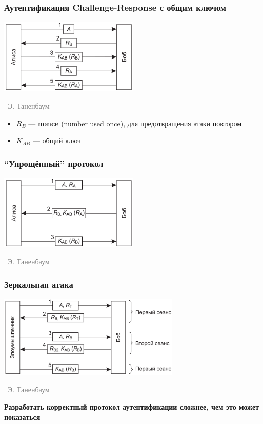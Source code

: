 \documentclass[xetex,mathserif,serif]{beamer}
\newcommand{\attribution}[1] {
\vspace{-5mm}\begin{flushright}\begin{scriptsize}\textcolor{gray}{\textcopyright\, #1}\end{scriptsize}\end{flushright}
}
\begin{document}
    \begin{frame}
        \frametitle{Аутентификация Challenge-Response с общим ключом}
        \begin{center}
            \includegraphics[width=0.5\textwidth]{challengeResponse.png}
            \attribution{Э. Таненбаум}
        \end{center}
        \begin{itemize}
            \item $R_B$ --- \textbf{nonce} (number used once), для предотвращения атаки повтором
            \item $K_{AB}$ --- общий ключ
        \end{itemize}
    \end{frame}

    \begin{frame}
        \frametitle{``Упрощённый'' протокол}
        \begin{center}
            \includegraphics[width=0.5\textwidth]{simpleChallengeResponse.png}
            \attribution{Э. Таненбаум}
        \end{center}
    \end{frame}

    \begin{frame}
        \frametitle{Зеркальная атака}
        \begin{center}
            \includegraphics[width=0.65\textwidth]{mirrorAttack.png}
            \attribution{Э. Таненбаум}
        \end{center}
        \vspace{5mm}
        \textbf{Разработать корректный протокол аутентификации сложнее, чем это может показаться}
    \end{frame}
\end{document}
